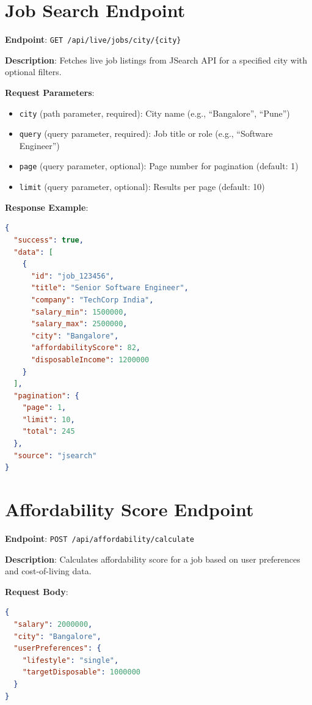 \section{Job Search Endpoint}

\textbf{Endpoint}: \texttt{GET /api/live/jobs/city/\{city\}}

\textbf{Description}: Fetches live job listings from JSearch API for a specified city with optional filters.

\textbf{Request Parameters}:
\begin{itemize}
    \item \texttt{city} (path parameter, required): City name (e.g., ``Bangalore'', ``Pune'')
    \item \texttt{query} (query parameter, required): Job title or role (e.g., ``Software Engineer'')
    \item \texttt{page} (query parameter, optional): Page number for pagination (default: 1)
    \item \texttt{limit} (query parameter, optional): Results per page (default: 10)
\end{itemize}

\textbf{Response Example}:
\begin{lstlisting}[language=json]
{
  "success": true,
  "data": [
    {
      "id": "job_123456",
      "title": "Senior Software Engineer",
      "company": "TechCorp India",
      "salary_min": 1500000,
      "salary_max": 2500000,
      "city": "Bangalore",
      "affordabilityScore": 82,
      "disposableIncome": 1200000
    }
  ],
  "pagination": {
    "page": 1,
    "limit": 10,
    "total": 245
  },
  "source": "jsearch"
}
\end{lstlisting}

\section{Affordability Score Endpoint}

\textbf{Endpoint}: \texttt{POST /api/affordability/calculate}

\textbf{Description}: Calculates affordability score for a job based on user preferences and cost-of-living data.

\textbf{Request Body}:
\begin{lstlisting}[language=json]
{
  "salary": 2000000,
  "city": "Bangalore",
  "userPreferences": {
    "lifestyle": "single",
    "targetDisposable": 1000000
  }
}
\end{lstlisting}


